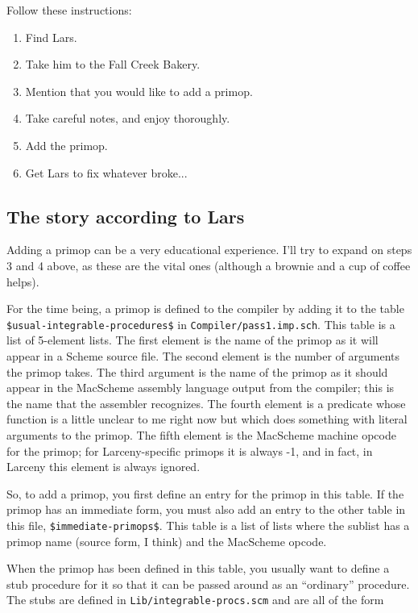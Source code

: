 Follow these instructions:
\begin{enumerate}
\item Find Lars.
\item Take him to the Fall Creek Bakery.
\item Mention that you would like to add a primop.
\item Take careful notes, and enjoy thoroughly.
\item Add the primop.
\item Get Lars to fix whatever broke...
\end{enumerate}

\subsection{The story according to Lars}

Adding a primop can be a very educational experience. I'll try to expand on
steps 3 and 4 above, as these are the vital ones (although a brownie and a
cup of coffee helps).

For the time being, a primop is defined to the compiler by adding it to the
table \verb+$usual-integrable-procedures$+ in {\tt Compiler/pass1.imp.sch}.
This table is a list of 5-element lists. The first element is the name of
the primop as it will appear in a Scheme source file.  The second element is
the number of arguments the primop takes. The third argument is the name of
the primop as it should appear in the MacScheme assembly language output
from the compiler; this is the name that the assembler recognizes. The
fourth element is a predicate whose function is a little unclear to me right
now but which does something with literal arguments to the primop. The fifth
element is the MacScheme machine opcode for the primop; for Larceny-specific
primops it is always -1, and in fact, in Larceny this element is always
ignored.

So, to add a primop, you first define an entry for the primop in this table.
If the primop has an immediate form, you must also add an entry to the
other table in this file, \verb+$immediate-primops$+. This table is a list
of lists where the sublist has a primop name (source form, I think) and the
MacScheme opcode.

When the primop has been defined in this table, you usually want to define
a stub procedure for it so that it can be passed around as an ``ordinary''
procedure. The stubs are defined in {\tt Lib/integrable-procs.scm} and are
all of the form

